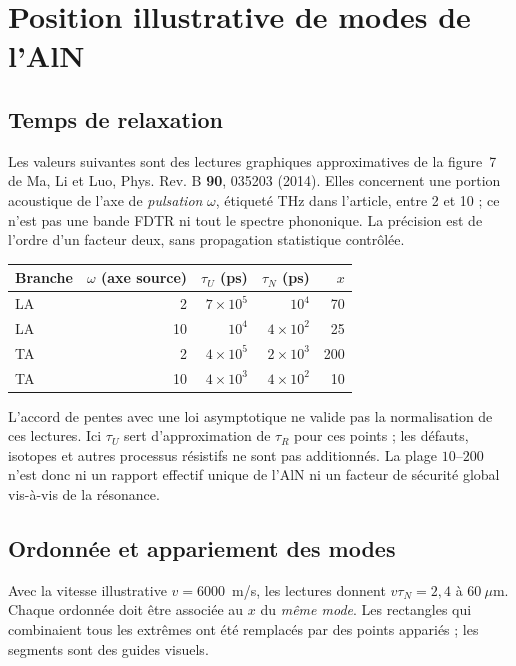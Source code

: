 \documentclass[11pt,a4paper]{article}
\begin{document}
\section{Position illustrative de modes de l'AlN}
\subsection{Temps de relaxation}
Les valeurs suivantes sont des lectures graphiques approximatives de la
figure~7 de Ma, Li et Luo, Phys. Rev. B \textbf{90}, 035203 (2014).
Elles concernent une portion acoustique de l'axe de \emph{pulsation}
$\omega$, étiqueté THz dans l'article, entre 2 et 10 ; ce n'est pas une
bande FDTR ni tout le spectre phononique. La précision est de l'ordre d'un
facteur deux, sans propagation statistique contrôlée.

\begin{center}
\begin{tabular}{@{}lrrrr@{}}
\toprule
Branche & $\omega$ (axe source) & $\tau_U$ (ps) & $\tau_N$ (ps) & $x$ \\
\midrule
LA & 2 & $7\times10^5$ & $10^4$ & 70 \\
LA & 10 & $10^4$ & $4\times10^2$ & 25 \\
TA & 2 & $4\times10^5$ & $2\times10^3$ & 200 \\
TA & 10 & $4\times10^3$ & $4\times10^2$ & 10 \\
\bottomrule
\end{tabular}
\end{center}

L'accord de pentes avec une loi asymptotique ne valide pas la normalisation
de ces lectures. Ici $\tau_U$ sert d'approximation de $\tau_R$ pour ces points ;
les défauts, isotopes et autres processus résistifs ne sont pas additionnés.
La plage $10$--$200$ n'est donc ni un rapport effectif unique de l'AlN
ni un facteur de sécurité global vis-à-vis de la résonance.

\subsection{Ordonnée et appariement des modes}
Avec la vitesse illustrative $v=6000$~m/s, les lectures donnent
$v\tau_N=2{,}4$ à $60~\mu$m. Chaque ordonnée doit être associée au
$x$ du \emph{même mode}. Les rectangles qui combinaient tous les extrêmes
ont été remplacés par des points appariés ; les segments sont des guides visuels.
\end{document}
